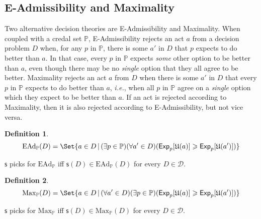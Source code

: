 \documentclass[a4paper]{article}
\newtheorem{definition}{Definition}
\newcommand\D{\mathcal{D}}
\newcommand\s{\mathsf{s}}
\renewcommand\P{\mathbb{P}} %
\newcommand\Exp{\mathsf{Exp}}
\newcommand\EAd{\mathrm{EAd}}
\newcommand\U{\mathfrak{U}} %
\newcommand\Maximality{\mathrm{Max}}
\newcommand{\IP}{\P}
\newcommand{\todoinfo}[2][]{\todo[backgroundcolor=orange!80,bordercolor=black,linecolor=gray!80, #1,inline,caption={}]{#2}}
\newcommand\SetDelimiter[1][]{
	\nonscript\,#1\vert \allowbreak \nonscript\,\mathopen{}}
\providecommand\given{\SetDelimiter}
\renewcommand{\geq}{\geqslant}
\newenvironment{CCM rewritten}
{\begingroup\color{blue}} %
{\endgroup}              %
\begin{document}

\subsection{E-Admissibility and Maximality}\label{sect:e-admiss}\label{sect:Max}


{ Two alternative decision theories are E-Admissibility and Maximality. When coupled with a credal set $\IP$, E-Admissibility rejects an act $a$ from a decision problem $D$ when, for any $p$ in $\IP$, there is some $a'$ in $D$ that $p$ expects to do better than $a$. In that case, every $p$ in $\IP$ expects \textit{some} other option to be better than $a$, even though there may be no \textit{single} option that they all agree to be better. Maximality rejects an act $a$ from $D$ when there is some $a'$ in $D$ that every $p$ in $\IP$ expects to do better than $a$, \textit{i.e.}, when all $p$ in $\IP$ agree on a \textit{single} option which they expect to be better than $a$. If an act is rejected according to Maximality, then it is also rejected according to E-Admissibility, but not vice versa.}

\begin{definition}
 $$\EAd_\IP(D) = \Set{a \in D \given (\exists p \in \IP)(\forall a' \in D)(\Exp_p[\U(a)]\geq\Exp_p[\U(a')])}
	$$\end{definition}
	 $\s$ picks for $\EAd_\IP$ iff $\s(D)\in\EAd_\IP(D)$ for every $D\in\D$.
	

	
	\begin{definition}
	$$\Maximality_\IP(D) = \Set{a \in D \given (\forall a'\in D)(\exists p\in\IP)(\Exp_p[\U(a)] \geq\Exp_p[\U(a')])}$$
\end{definition}
	 $\s$ picks for $\Maximality_\IP$ iff $\s(D)\in\Maximality_\IP(D)$ for every $D\in\D$.
\end{document}
